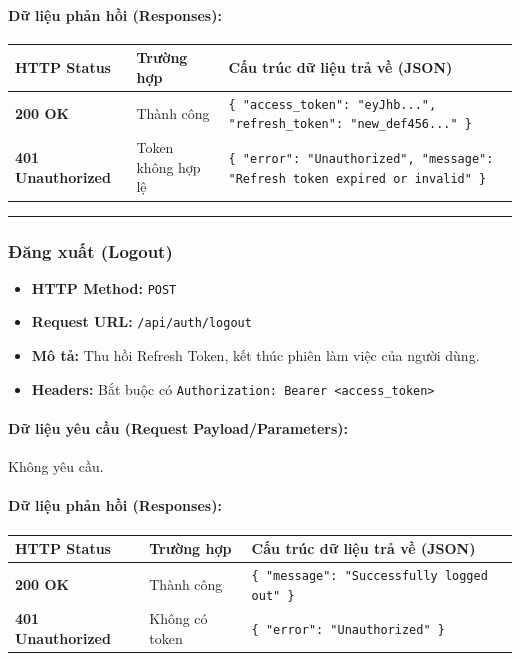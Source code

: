 \documentclass[12pt,a4paper]{article}
\begin{document}
\paragraph{Dữ liệu phản hồi (Responses):}
\begin{longtable}{|p{2.8cm}|p{3.2cm}|p{8.0cm}|}
\hline
\textbf{HTTP Status} & \textbf{Trường hợp} & \textbf{Cấu trúc dữ liệu trả về (JSON)} \\ \hline
\endhead
\textbf{200 OK} & Thành công & \texttt{\{ "access\_token": "eyJhb...", "refresh\_token": "new\_def456..." \}} \\ \hline
\textbf{401 Unauthorized} & Token không hợp lệ & \texttt{\{ "error": "Unauthorized", "message": "Refresh token expired or invalid" \}} \\ \hline
\end{longtable}

\vskip 0.4cm
\noindent\rule{\textwidth}{0.3pt}
\vskip 0.4cm

\subsubsection{Đăng xuất (Logout)}
\begin{itemize}[leftmargin=*]
    \item \textbf{HTTP Method:} \texttt{POST}
    \item \textbf{Request URL:} \texttt{/api/auth/logout}
    \item \textbf{Mô tả:} Thu hồi Refresh Token, kết thúc phiên làm việc của người dùng.
    \item \textbf{Headers:} Bắt buộc có \texttt{Authorization: Bearer \textless{}access\_token\textgreater{}}
\end{itemize}

\paragraph{Dữ liệu yêu cầu (Request Payload/Parameters):}
Không yêu cầu.\\

\paragraph{Dữ liệu phản hồi (Responses):}
\begin{longtable}{|p{2.8cm}|p{3.2cm}|p{8.0cm}|}
\hline
\textbf{HTTP Status} & \textbf{Trường hợp} & \textbf{Cấu trúc dữ liệu trả về (JSON)} \\ \hline
\endhead
\textbf{200 OK} & Thành công & \texttt{\{ "message": "Successfully logged out" \}} \\ \hline
\textbf{401 Unauthorized} & Không có token & \texttt{\{ "error": "Unauthorized" \}} \\ \hline
\end{longtable}
\end{document}
